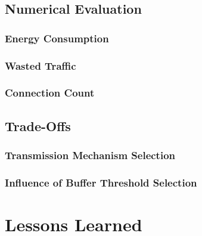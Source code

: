 \subsection{Numerical Evaluation}
\subsubsection*{Energy Consumption}
\subsubsection*{Wasted Traffic}
\subsubsection*{Connection Count}

\subsection{Trade-Offs}
\subsubsection*{Transmission Mechanism Selection}
\subsubsection*{Influence of Buffer Threshold Selection}

\section{Lessons Learned}
